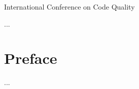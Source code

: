 \documentclass[12pt,a4,twosides]{book}
\begin{document}
International Conference on Code Quality

...

\newpage

\section{Preface}

...

\newpage

\tableofcontents



\end{document}

